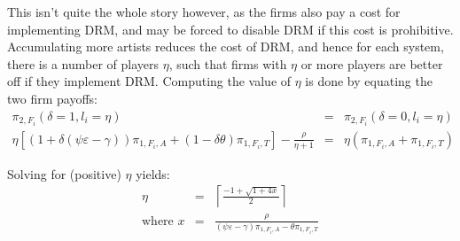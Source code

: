 \documentclass[a4paper,12pt]{article}
\numberwithin{equation}{section}
\newcommand{\firmpayoff}[2]{\pi_{{#1}, F_{#2}}}
\newcommand{\firmalbum}[2]{\pi_{#1, F_{#2}, A}}
\newcommand{\firmticket}[2]{\pi_{#1, F_{#2}, T}}
\newcommand{\drminf}{(\psi \varepsilon - \gamma)}
\def\lc{\left\lceil}
\def\rc{\right\rceil}
\begin{document}
This isn't quite the whole story however, as the firms also pay a cost for implementing DRM, and may be forced to disable DRM if this cost is prohibitive. Accumulating more artists reduces the cost of DRM, and hence for each system, there is a number of players $\eta$, such that firms with $\eta$ or more players are better off if they implement DRM. Computing the value of $\eta$ is done by equating the two firm payoffs:
\begin{eqnarray*}
\firmpayoff{2}{i}(\delta = 1, l_i = \eta) & = & \firmpayoff{2}{i}(\delta = 0, l_i = \eta)\\
\eta \left[\left(1 + \delta \drminf\right) \firmalbum{1}{i} + (1 - \delta \theta) \firmticket{1}{i}\right] - \frac{\rho}{\eta + 1} & = & \eta (\firmalbum{1}{i} + \firmticket{1}{i})
\end{eqnarray*}

Solving for (positive) $\eta$ yields:
\begin{eqnarray}
\eta & = & \lc \frac{-1 + \sqrt{1 + 4 x}}{2} \rc \\
\text{where } x & = & \frac{\rho}{\drminf \firmalbum{1}{i} - \theta \firmticket{1}{i}} \nonumber
\end{eqnarray}
\end{document}
